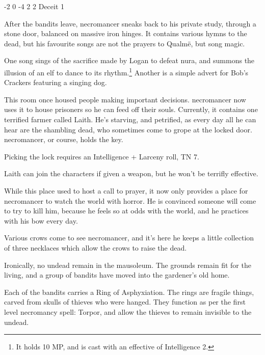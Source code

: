 \begin{multicols}{2}

{-2}%
{0}%
{-4}%
{2}%
{2}%
{Deceit 1}%
{\partialleather}%
{}%


After the bandits leave, \gls{necromancer} sneaks back to his private study, through a stone door, balanced on massive iron hinges.  It contains various hymns to the dead, but his favourite songs are not the prayers to Qualm\"{e}, but song magic.

One song sings of the sacrifice made by Logan to defeat nura, and summons the illusion of an elf to dance to its rhythm.\footnote{It holds 10 MP, and is cast with an effective of Intelligence 2.}
Another is a simple advert for Bob's Crackers featuring a singing dog.


This room once housed people making important decisions.  \Gls{necromancer} now uses it to house prisoners so he can feed off their souls.
Currently, it contains one terrified farmer called Laith.
He's starving, and petrified, as every day all he can hear are the shambling dead, who sometimes come to grope at the locked door.
\Gls{necromancer}, or course, holds the key.

Picking the lock requires an Intelligence + Larceny roll, TN 7.


Laith can join the characters if given a weapon, but he won't be terrifly effective.

\humanfarmer


While this place used to host a call to prayer, it now only provides a place for \gls{necromancer} to watch the world with horror.  He is convinced someone will come to try to kill him, because he feels so at odds with the world, and he practices with his bow every day.

Various crows come to see \gls{necromancer}, and it's here he keeps a little collection of three necklaces which allow the crows to raise the dead.


Ironically, no undead remain in the mausoleum.  The grounds remain fit for the living, and a group of bandits have moved into the gardener's old home.

Each of the bandits carries a Ring of Asphyxiation.
The rings are fragile things, carved from skulls of thieves who were hanged.
They function as per the first level necromancy spell: Torpor, and allow the thieves to remain invisible to the undead.


\end{multicols}
